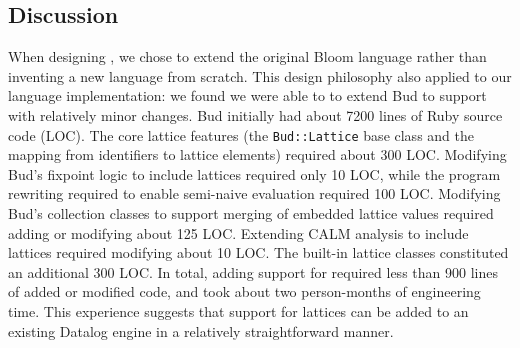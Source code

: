 \subsection{Discussion}
When designing \lang, we chose to extend the original Bloom language rather than
inventing a new language from scratch. This design philosophy also applied to our
language implementation: we found we were able to to extend Bud to support \lang
with relatively minor changes. Bud initially had about 7200 lines of Ruby source
code (LOC). The core lattice features (the \texttt{Bud::Lattice} base class and
the mapping from identifiers to lattice elements) required about 300
LOC. Modifying Bud's fixpoint logic to include lattices required only 10 LOC,
while the program rewriting required to enable semi-naive evaluation required
100 LOC. Modifying Bud's collection classes to support merging of embedded
lattice values required adding or modifying about 125 LOC. Extending CALM
analysis to include lattices required modifying about 10 LOC. The built-in
lattice classes constituted an additional 300 LOC. In total, adding support for
\lang required less than 900 lines of added or modified code, and took about two
person-months of engineering time. This experience suggests that support for
lattices can be added to an existing Datalog engine in a relatively
straightforward manner.
